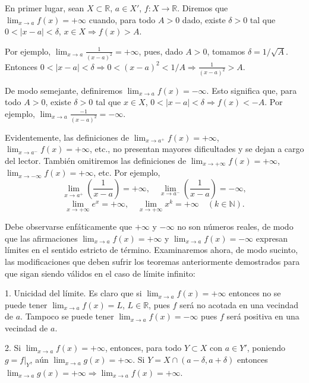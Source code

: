 \documentclass[12pt,oneside]{book}
\begin{document}
En primer lugar, sean \( X \subset \mathbb{R} \), \( a \in X' \), \( f: X \to \mathbb{R} \). Diremos que \( \lim_{x \to a} f(x) = +\infty \) cuando, para todo \( A > 0 \) dado, existe \( \delta > 0 \) tal que \( 0 < |x - a| < \delta \), \( x \in X \Rightarrow f(x) > A \).

Por ejemplo, \( \lim_{x \to a} \frac{1}{(x - a)^2} = +\infty \), pues, dado \( A > 0 \), tomamos \( \delta = 1/\sqrt{A} \). Entonces \( 0 < |x - a| < \delta \Rightarrow 0 < (x - a)^2 < 1/A \Rightarrow \frac{1}{(x - a)^2} > A \).

De modo semejante, definiremos \( \lim_{x \to a} f(x) = -\infty \). Esto significa que, para todo \( A > 0 \), existe \( \delta > 0 \) tal que \( x \in X \), \( 0 < |x - a| < \delta \Rightarrow f(x) < -A \). Por ejemplo, \( \lim_{x \to a} \frac{-1}{(x - a)^2} = -\infty \).

Evidentemente, las definiciones de \( \lim_{x \to a^+} f(x) = +\infty \), \( \lim_{x \to a^-} f(x) = +\infty \), etc., no presentan mayores dificultades y se dejan a cargo del lector. También omitiremos las definiciones de \( \lim_{x \to +\infty} f(x) = +\infty \), \( \lim_{x \to -\infty} f(x) = +\infty \), etc. Por ejemplo,
\[
\lim_{x \to a^+} \left( \frac{1}{x - a} \right) = +\infty, \quad \lim_{x \to a^-} \left( \frac{1}{x - a} \right) = -\infty,
\]
\[
\lim_{x \to +\infty} e^x = +\infty, \quad \lim_{x \to +\infty} x^k = +\infty \quad (k \in \mathbb{N}).
\]

Debe observarse enfáticamente que \( +\infty \) y \( -\infty \) no son números reales, de modo que las afirmaciones \( \lim_{x \to a} f(x) = +\infty \) y \( \lim_{x \to a} f(x) = -\infty \) expresan límites en el sentido estricto de término. Examinaremos ahora, de modo sucinto, las modificaciones que deben sufrir los teoremas anteriormente demostrados para que sigan siendo válidos en el caso de límite infinito:

1. Unicidad del límite. Es claro que si \(\lim_{x \to a} f(x) = +\infty\) entonces no se puede tener \(\lim_{x \to a} f(x) = L\), \(L \in \mathbb{R}\), pues \(f\) será no acotada en una vecindad de \(a\). Tampoco se puede tener \(\lim_{x \to a} f(x) = -\infty\) pues \(f\) será positiva en una vecindad de \(a\).

2. Si \(\lim_{x \to a} f(x) = +\infty\), entonces, para todo \(Y \subset X\) con \(a \in Y'\), poniendo \(g = f|_Y\), aún \(\lim_{x \to a} g(x) = +\infty\). Si \(Y = X \cap (a-\delta, a+\delta)\) entonces \(\lim_{x \to a} g(x) = +\infty \Rightarrow \lim_{x \to a} f(x) = +\infty\).
\end{document}
